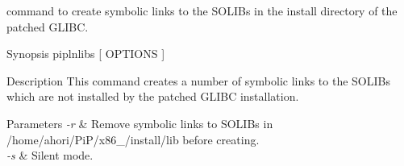 command to create symbolic links to the S\-O\-L\-I\-Bs in the install directory of the patched G\-L\-I\-B\-C.

\begin{DoxyParagraph}{Synopsis}
piplnlibs \mbox{[} O\-P\-T\-I\-O\-N\-S \mbox{]}
\end{DoxyParagraph}
\begin{DoxyParagraph}{Description}
This command creates a number of symbolic links to the S\-O\-L\-I\-Bs which are not installed by the patched G\-L\-I\-B\-C installation.
\end{DoxyParagraph}

\begin{DoxyParams}{Parameters}
{\em -\/r} & Remove symbolic links to S\-O\-L\-I\-Bs in /home/ahori/\-Pi\-P/x86\-\_/install/lib before creating. \\
\hline
{\em -\/s} & Silent mode. \\
\hline
\end{DoxyParams}
